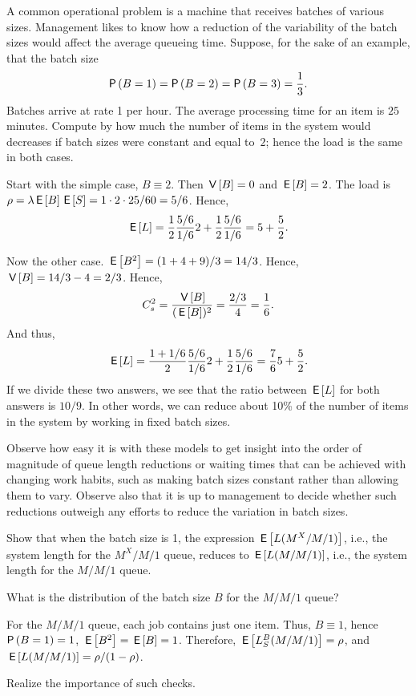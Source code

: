 \begin{exercise}
 A common operational problem is a machine that receives batches of
 various sizes. Management likes to know how a reduction of the
 variability of the batch sizes would affect the average queueing time.
 Suppose, for the sake of an example, that the batch size 
 \begin{equation*}
 \P{B=1} = \P{B=2} = \P{B=3} = \frac 13.
 \end{equation*}
 Batches arrive at rate 1 per hour.
 The average processing time for an item is $25$ minutes.
 Compute by how much the number of items in the system would decreases if batch sizes were constant and equal to~$2$; hence the load is the same in both cases.
\begin{solution}
 Start with the simple case, $B\equiv 2$. Then $\,\mathsf{V}\left[B\right]=0$ and
 $\,\mathsf{E}\left[B\right] = 2$. The load is $\rho=\lambda \,\mathsf{E}\left[B\right] \,\mathsf{E}\left[S\right] = 1\cdot 2 \cdot 25/60 = 5/6$. Hence,
 \begin{equation*}
 \,\mathsf{E}\left[L\right] = \frac 12 \frac{5/6}{1/6} 2 + \frac 12 \frac{5/6}{1/6} = 5 + \frac52.
 \end{equation*}

Now the other case. $\,\mathsf{E}\left[B^2\right] = (1+4+9)/3 = 14/3$. Hence, $\,\mathsf{V}\left[B\right]=14/3 - 4=2/3$. Hence, 
\begin{equation*}
C_s^2=\frac{\,\mathsf{V}\left[B\right]}{(\,\mathsf{E}\left[B\right])^2} = \frac{2/3}4 = \frac 16.
\end{equation*}
And thus, 
 \begin{equation*}
 \,\mathsf{E}\left[L\right] = \frac {1+1/6}2 \frac{5/6}{1/6} 2 + \frac 12 \frac{5/6}{1/6} = \frac76 5 + \frac 52.
 \end{equation*}
 If we divide these two answers, we see that the ratio between
 $\,\mathsf{E}\left[L\right]$ for both answers is $10/9$. In other words, we can
 reduce about 10\% of the number of items in the system by working
 in fixed batch sizes. 

Observe how easy it is with these models to get insight into the order of magnitude of queue length reductions or waiting times that can be achieved with changing work habits, such as making batch sizes constant rather than allowing them to vary.
Observe also that it is up to management to decide whether such reductions outweigh any efforts to reduce the variation in batch sizes.

\end{solution}

\end{exercise}

\begin{extra}
 Show that when the batch size is 1, the expression $\,\mathsf{E}\left[L(M^X/M/1)\right]$, i.e., the system length for the $M^X/M/1$ queue, reduces to
 $\,\mathsf{E}\left[L(M/M/1)\right]$, i.e., the system length for the $M/M/1$ queue. 
\begin{hint}
What is the distribution of the batch size $B$ for the $M/M/1$ queue?
\end{hint}
\begin{solution}
 For the $M/M/1$ queue, each job contains just one item. Thus,
 $B\equiv 1$, hence $\P{B=1}=1$, $\,\mathsf{E}\left[B^2\right]=\,\mathsf{E}\left[B\right] =1$. Therefore,
 $\,\mathsf{E}\left[L_S^B(M/M/1)\right]= \rho$, and $\,\mathsf{E}\left[L(M/M/1)\right]=\rho/(1-\rho)$. 
\end{solution}
Realize the importance of such checks.
\end{extra}


